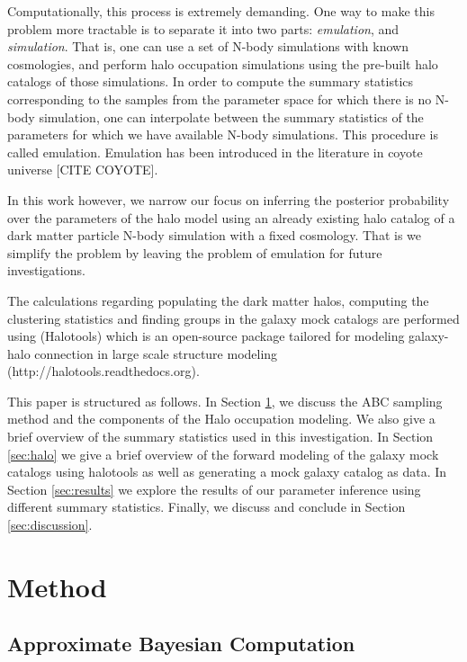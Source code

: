 \documentclass[12pt, preprint]{aastex}
\begin{document}
Computationally, this process is extremely demanding. One way to make this problem more tractable is to separate it into two parts: \emph{emulation}, and \emph{simulation}. That is, one can use a set of N-body simulations with known cosmologies, and perform halo occupation simulations using the pre-built halo catalogs of those simulations. In order to compute the summary statistics corresponding to the samples from the parameter space for which there is no N-body simulation, one can interpolate between the summary statistics of the parameters for which we have available N-body simulations. This procedure is called emulation. Emulation has been introduced in the literature in coyote universe [CITE COYOTE].

In this work however, we narrow our focus on inferring the posterior probability over the parameters of the halo model using an already existing halo catalog of a dark matter particle N-body simulation with a fixed cosmology. That is we simplify the problem by leaving the problem of emulation for future investigations.

The calculations regarding populating the dark matter halos, computing the clustering statistics and finding groups in the galaxy mock catalogs are performed using ({\selectfont Halotools}) which is an open-source package tailored for modeling galaxy-halo connection in large scale structure modeling ({\selectfont http://halotools.readthedocs.org}).

This paper is structured as follows. In Section \ref{sec:method},
we discuss the ABC sampling method and the components of the Halo occupation modeling. We also give a brief overview of the summary statistics used in this investigation. In Section \ref{sec:halo} we give a brief overview of the forward modeling of the galaxy mock catalogs using halotools as well as generating a mock galaxy catalog as data. In Section \ref{sec:results} we explore the results of our parameter inference using different summary statistics. Finally, we discuss and conclude in Section \ref{sec:discussion}.

\section{Method}\label{sec:method}

\subsection{Approximate Bayesian Computation}
\end{document}
